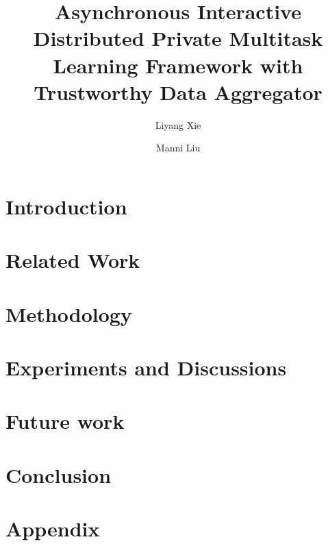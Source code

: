 \documentclass[11pt,twocolumn]{ieee}
\title{Asynchronous Interactive Distributed Private Multitask Learning Framework with Trustworthy Data Aggregator}
\author{Liyang Xie\and Manni Liu\\
}
\begin{document}
\maketitle


\begin{abstract}

\end{abstract}


\section{Introduction}



\section{Related Work}



\section{Methodology}



\section{Experiments and Discussions}



\section{Future work}



\section{Conclusion}



\section{Appendix}





\end{document}
